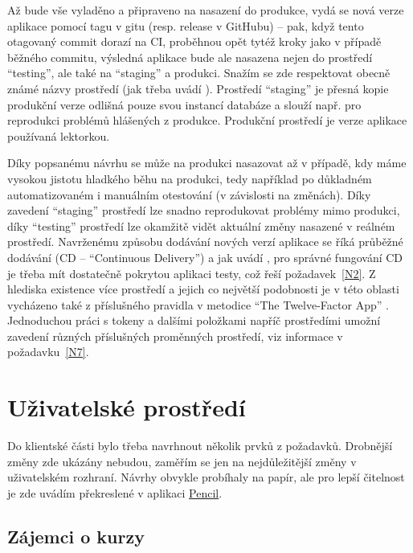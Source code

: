 Až bude vše vyladěno a připraveno na nasazení do produkce, vydá se nová verze aplikace pomocí tagu v gitu (resp. release v GitHubu) -- pak, když tento otagovaný commit dorazí na CI, proběhnou opět tytéž kroky jako v případě běžného commitu, výsledná aplikace bude ale nasazena nejen do prostředí \enquote{testing}, ale také na \enquote{staging} a produkci. Snažím se zde respektovat obecně známé názvy prostředí (jak třeba uvádí \cite{deployment-beanstalk, deployment-oroinc}). Prostředí \enquote{staging} je přesná kopie produkční verze odlišná pouze svou instancí databáze a slouží např. pro reprodukci problémů hlášených z produkce. Produkční prostředí je verze aplikace používaná lektorkou.

Díky popsanému návrhu se může na produkci nasazovat až v případě, kdy máme vysokou jistotu hladkého běhu na produkci, tedy například po důkladném automatizovaném i manuálním otestování (v závislosti na změnách). Díky zavedení \enquote{staging} prostředí lze snadno reprodukovat problémy mimo produkci, díky \enquote{testing} prostředí lze okamžitě vidět aktuální změny nasazené v reálném prostředí. Navrženému způsobu dodávání nových verzí aplikace se říká průběžné dodávání (CD -- \enquote{Continuous Delivery}) \cite{deployment-atlassian} a jak uvádí \cite{deployment-atlassian}, pro správné fungování CD je třeba mít dostatečně pokrytou aplikaci testy, což řeší požadavek~\ref{N2}. Z hlediska existence více prostředí a jejich co největší podobnosti je v této oblasti vycházeno také z příslušného pravidla v metodice \enquote{The Twelve-Factor App} \cite{12factor-envs}. Jednoduchou práci s tokeny a dalšími položkami napříč prostředími umožní zavedení různých příslušných proměnných prostředí, viz informace v požadavku~\ref{N7}.

\section{Uživatelské prostředí}\label{sec:uzivatelskeprostredi}

Do klientské části bylo třeba navrhnout několik prvků z požadavků. Drobnější změny zde ukázány nebudou, zaměřím se jen na nejdůležitější změny v uživatelském rozhraní. Návrhy obvykle probíhaly na papír, ale pro lepší čitelnost je zde uvádím překreslené v aplikaci \href{https://pencil.evolus.vn/}{Pencil}.

\subsection{Zájemci o kurzy}

